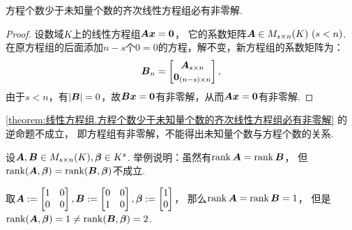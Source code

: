 \begin{corollary}\label{theorem:线性方程组.方程个数少于未知量个数的齐次线性方程组必有非零解}
方程个数少于未知量个数的齐次线性方程组必有非零解.
\begin{proof}
设数域\(K\)上的线性方程组\(\boldsymbol{A} \boldsymbol{x} = \boldsymbol0\)，
它的系数矩阵\(\boldsymbol{A} \in M_{s \times n}(K)\ (s<n)\).
在原方程组的后面添加\(n-s\)个\(0=0\)的方程，解不变，新方程组的系数矩阵为：
\begin{equation*}
	\boldsymbol{B}_n = \begin{bmatrix} \boldsymbol{A}_{s \times n} \\ \boldsymbol0_{(n-s) \times n} \end{bmatrix},
\end{equation*}
由于\(s < n\)，有\(\abs{\boldsymbol{B}} = 0\)，故\(\boldsymbol{B} \boldsymbol{x} = \boldsymbol0\)有非零解，从而\(\boldsymbol{A} \boldsymbol{x} = \boldsymbol0\)有非零解.
\end{proof}
\end{corollary}
\begin{remark}
\cref{theorem:线性方程组.方程个数少于未知量个数的齐次线性方程组必有非零解} 的逆命题不成立，
即方程组有非零解，不能得出未知量个数与方程个数的关系.
\end{remark}

\begin{example}
设\(
	\boldsymbol{A},\boldsymbol{B} \in M_{s \times n}(K),
	\boldsymbol\beta \in K^s
\).
举例说明：虽然有\(\rank\boldsymbol{A} = \rank\boldsymbol{B}\)，
但\(\rank(\boldsymbol{A},\boldsymbol\beta) = \rank(\boldsymbol{B},\boldsymbol\beta)\)不成立.
\begin{solution}
取\(
	\boldsymbol{A}
	:=
	\begin{bmatrix}
		1 & 0 \\
		0 & 0
	\end{bmatrix},
	\boldsymbol{B}
	:=
	\begin{bmatrix}
		0 & 0 \\
		1 & 0
	\end{bmatrix},
	\boldsymbol\beta
	:=
	\begin{bmatrix}
		1 \\ 0
	\end{bmatrix}
\)，
那么\(\rank\boldsymbol{A} = \rank\boldsymbol{B} = 1\)，
但是\(
	\rank(\boldsymbol{A},\boldsymbol\beta)
	= 1
	\neq
	\rank(\boldsymbol{B},\boldsymbol\beta)
	= 2
\).
\end{solution}
\end{example}
